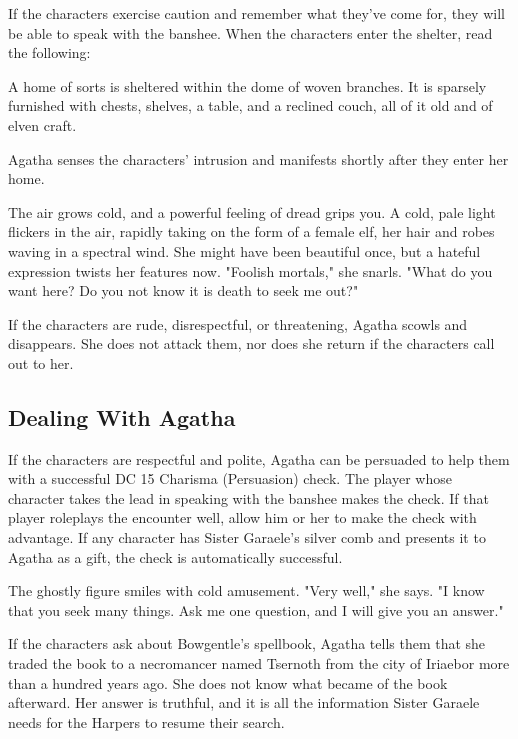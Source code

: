 \documentclass[10pt,a4paper,twoside,bg=print,twocolumn,openany,nodeprecatedcode]{dndbook}
\begin{document}
If the characters exercise caution and remember what they've come for, they will be able to speak with the banshee. When the characters enter the shelter, read the following:

\begin{DndReadAloud}{}
A home of sorts is sheltered within the dome of woven branches. It is sparsely furnished with chests, shelves, a table, and a reclined couch, all of it old and of elven craft.

\end{DndReadAloud}

Agatha senses the characters' intrusion and manifests shortly after they enter her home.

\begin{DndReadAloud}{}
The air grows cold, and a powerful feeling of dread grips you. A cold, pale light flickers in the air, rapidly taking on the form of a female elf, her hair and robes waving in a spectral wind. She might have been beautiful once, but a hateful expression twists her features now. "Foolish mortals," she snarls. "What do you want here? Do you not know it is death to seek me out?"

\end{DndReadAloud}

If the characters are rude, disrespectful, or threatening, Agatha scowls and disappears. She does not attack them, nor does she return if the characters call out to her.

\subsection{Dealing With Agatha}
If the characters are respectful and polite, Agatha can be persuaded to help them with a successful DC 15 Charisma (Persuasion) check. The player whose character takes the lead in speaking with the banshee makes the check. If that player roleplays the encounter well, allow him or her to make the check with advantage. If any character has Sister Garaele's silver comb and presents it to Agatha as a gift, the check is automatically successful.

\begin{DndReadAloud}{}
The ghostly figure smiles with cold amusement. "Very well," she says. "I know that you seek many things. Ask me one question, and I will give you an answer."

\end{DndReadAloud}

If the characters ask about Bowgentle's spellbook, Agatha tells them that she traded the book to a necromancer named Tsernoth from the city of Iriaebor more than a hundred years ago. She does not know what became of the book afterward. Her answer is truthful, and it is all the information Sister Garaele needs for the Harpers to resume their search.
\end{document}
